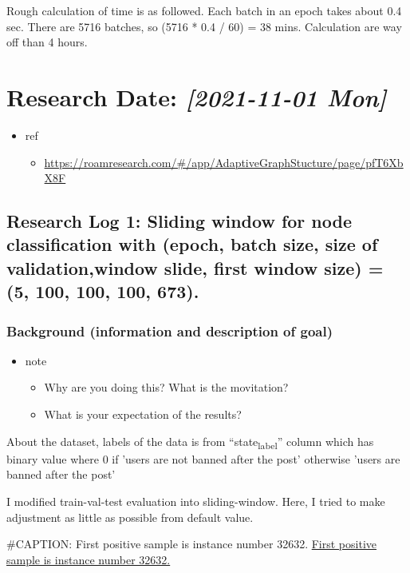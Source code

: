 \documentclass[11pt]{article}
\begin{document}
Rough calculation of time is as followed.
Each batch in an epoch takes about 0.4 sec.
There are 5716 batches, so (5716 * 0.4 / 60) = 38 mins.
Calculation are way off than 4 hours.



\section{Research Date: \textit{[2021-11-01 Mon]}}
\label{sec:org6f40ade}
\begin{itemize}
\item ref
\begin{itemize}
\item \url{https://roamresearch.com/\#/app/AdaptiveGraphStucture/page/pfT6XbX8F}
\end{itemize}
\end{itemize}
\subsection{Research Log 1: Sliding window for node classification with (epoch, batch size, size of validation,window slide, first window size) = (5, 100, 100, 100, 673).}
\label{sec:orge289fc4}
\subsubsection{Background (information and description of goal)}
\label{sec:org997c455}
\begin{itemize}
\item note
\begin{itemize}
\item Why are you doing this? What is the movitation?
\item What is your expectation of the results?
\end{itemize}
\end{itemize}

About the dataset, labels of the data is from ``state\textsubscript{label}'' column which has binary value where 0 if 'users are not banned after the post' otherwise 'users are banned after the post'

I modified train-val-test evaluation into sliding-window.
Here, I tried to make adjustment as little as possible from default value.

\#CAPTION: First positive sample is instance number 32632.
\href{file:///mnt/c/Users/terng/OneDrive/Documents/Working/tgn/references/first\_pos\_sample\_for\_node\_classification.PNG}{First positive sample is instance number 32632.}
\end{document}
